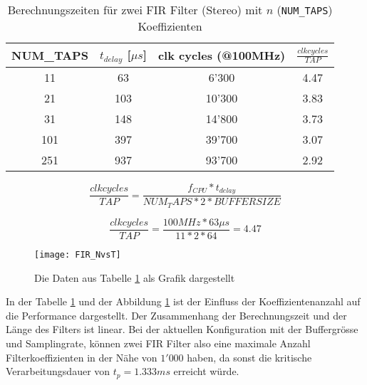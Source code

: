 \begin{table}[H]
	\centering
	\begin{tabular}{|c|c|c|c|}
		\hline
		\textbf{NUM\_TAPS} & \textbf{$t_{delay}$ {[}$\mu s${]}} & \textbf{clk cycles (@100MHz)} & \textbf{$\frac{\si{clk cycles}}{\si{TAP}}$} \\ \hline
		11                 & 63                      & 6'300                          & 4.47                       \\ \hline
		21                 & 103                     & 10'300                         & 3.83                       \\ \hline
		31                 & 148                     & 14'800                         & 3.73                       \\ \hline
		101                & 397                     & 39'700                         & 3.07                       \\ \hline
		251                & 937                     & 93'700                         & 2.92                       \\ \hline
	\end{tabular}
	\caption{Berechnungszeiten für zwei FIR Filter (Stereo) mit $n$ (\texttt{NUM\_TAPS}) Koeffizienten}
	\label{tab:FIR_performance}
\end{table}

\begin{equation}
\frac{clkcycles}{TAP}=\frac{f_{CPU}*t_{delay}}{NUM_TAPS*2*BUFFERSIZE}
\end{equation}

\begin{equation}
\frac{clkcycles}{TAP}=\frac{100\si{MHz}*63\mu\si{s}}{11*2*64}=4.47
\end{equation}

\begin{figure}[H]
	\centering
	\texttt{[image: FIR\_NvsT]}
	\caption{Die Daten aus Tabelle \ref{tab:FIR_performance} als Grafik dargestellt}
	\label{pic:FIR_NvsT}
\end{figure}

In der Tabelle \ref{tab:FIR_performance} und der Abbildung \ref{pic:FIR_NvsT} ist der Einfluss der Koeffizientenanzahl auf die Performance dargestellt.
Der Zusammenhang der Berechnungszeit und der Länge des Filters ist linear.
Bei der aktuellen Konfiguration mit der Buffergrösse und Samplingrate, können zwei FIR Filter also eine maximale Anzahl Filterkoeffizienten in der Nähe von $1'000$ haben, da sonst die kritische Verarbeitungsdauer von $t_{p}=1.333\si{ms}$ erreicht würde.

